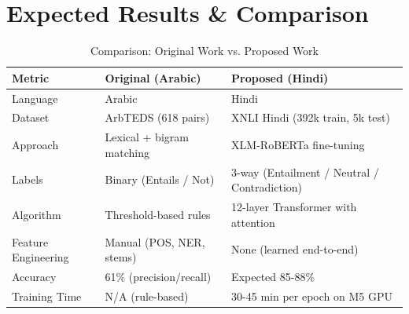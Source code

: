 \section{Expected Results \& Comparison}

\begin{table}[h]
\centering
\caption{Comparison: Original Work vs. Proposed Work}
\begin{tabularx}{\textwidth}{lXX}
\toprule
\textbf{Metric} & \textbf{Original (Arabic)} & \textbf{Proposed (Hindi)} \\
\midrule
Language & Arabic & Hindi \\
Dataset & ArbTEDS (618 pairs) & XNLI Hindi (392k train, 5k test) \\
Approach & Lexical + bigram matching & XLM-RoBERTa fine-tuning \\
Labels & Binary (Entails / Not) & 3-way (Entailment / Neutral / Contradiction) \\
Algorithm & Threshold-based rules & 12-layer Transformer with attention \\
Feature Engineering & Manual (POS, NER, stems) & None (learned end-to-end) \\
Accuracy & 61\% (precision/recall) & Expected 85-88\% \\
Training Time & N/A (rule-based) & 30-45 min per epoch on M5 GPU \\
\bottomrule
\end{tabularx}
\end{table}
